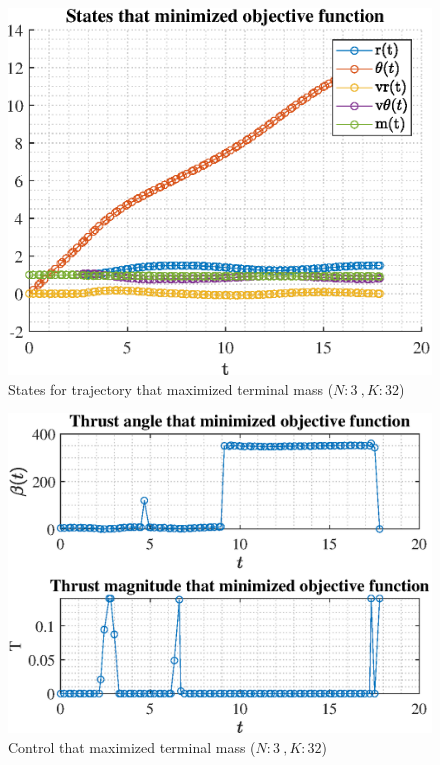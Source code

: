 \documentclass[]{article}
\begin{document}
\begin{figure}
	\centering
	\includegraphics[scale=0.75]{states_N3_K32_C2_mf.eps}
	\caption{States for trajectory that maximized terminal mass (\(N:3\ , K:32\))}
	\label{fig:states_N3_K32_C2_mf}
\end{figure}
\begin{figure}
	\centering
	\includegraphics[scale=0.75]{control_N3_K32_C2_mf.eps}
	\caption{Control that maximized terminal mass (\(N:3\ , K:32\))}
	\label{fig:control_N3_K32_C2_mf}
\end{figure}
\end{document}

